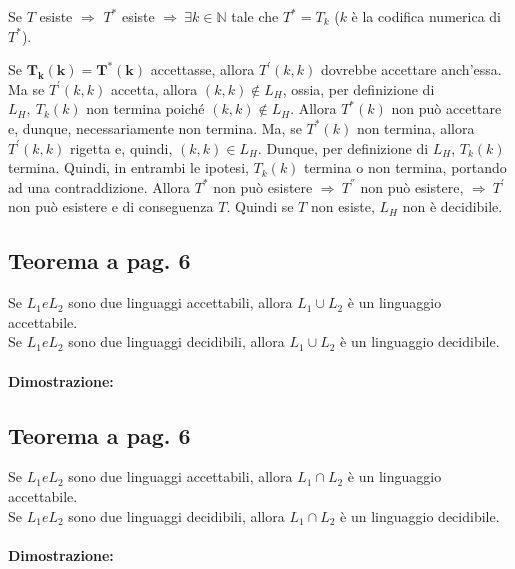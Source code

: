 Se $T$ esiste $\Rightarrow$ $T^{*}$ esiste $\Rightarrow\ \exists k\in \mathbb{N}$ tale che $T^{*} = T_{k}$ ($k$ è la codifica numerica di $T^{*}$).

Se $\mathbf{T_{k}(k) = T^{*}(k)}$ accettasse, allora $T^{'}(k, k)$ dovrebbe accettare
anch'essa. Ma se $T^{'}(k, k)$ accetta, allora $(k, k)\notin L_{H}$, ossia, per definizione di $L_{H},\ T_{k}(k)$ non termina poiché $(k, k) \notin L_{H}$.
Allora $T^{*}(k)$ non può accettare e, dunque, necessariamente non termina. Ma, se $T^{*}(k)$ non termina, allora $T^{'}(k, k)$ rigetta e, quindi, $(k, k)\in L_{H}$.
Dunque, per definizione di $L_{H}$, $T_{k}(k)$ termina. Quindi, in entrambi le ipotesi, $T_{k}(k)$ termina o non termina, portando ad una contraddizione. 
Allora $T^{*}$ non può esistere $\Rightarrow\ T^{''}$ non può esistere, $\Rightarrow\ T^{'}$ non può esistere e di conseguenza $T$. Quindi se $T$ non esiste, $L_{H}$ non è decidibile.

\subsection{Teorema a pag. 6}

Se $L_{1} e L_{2}$ sono due linguaggi accettabili, allora $L_{1} \cup L_{2}$ è un linguaggio accettabile.\\
Se $L_{1} e L_{2}$ sono due linguaggi decidibili, allora $L_{1} \cup L_{2}$ è un linguaggio decidibile.

\paragraph*{Dimostrazione:}

\subsection{Teorema a pag. 6}

Se $L_{1} e L_{2}$ sono due linguaggi accettabili, allora $L_{1} \cap L_{2}$ è un linguaggio accettabile.\\
Se $L_{1} e L_{2}$ sono due linguaggi decidibili, allora $L_{1} \cap L_{2}$ è un linguaggio decidibile.

\paragraph*{Dimostrazione:}
